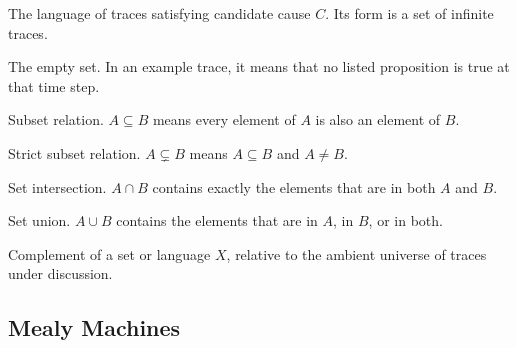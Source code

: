 \documentclass[11pt]{article}
\theoremstyle{remark}
\newcommand{\Lang}{\mathcal{L}}
\begin{document}
\begin{description}[leftmargin=2.8cm,style=nextline]
  \item[\(\Lang(C)\)]
  The language of traces satisfying candidate cause \(C\). Its form is a set of
  infinite traces.

  \item[\(\emptyset\)]
  The empty set. In an example trace, it means that no listed proposition is
  true at that time step.

  \item[\(\subseteq\)]
  Subset relation. \(A\subseteq B\) means every element of \(A\) is also an
  element of \(B\).

  \item[\(\subsetneq\)]
  Strict subset relation. \(A\subsetneq B\) means \(A\subseteq B\) and
  \(A\neq B\).

  \item[\(\cap\)]
  Set intersection. \(A\cap B\) contains exactly the elements that are in both
  \(A\) and \(B\).

  \item[\(\cup\)]
  Set union. \(A\cup B\) contains the elements that are in \(A\), in \(B\), or
  in both.

  \item[\(\overline{X}\)]
  Complement of a set or language \(X\), relative to the ambient universe of
  traces under discussion.
\end{description}

\subsection*{Mealy Machines}
\end{document}
